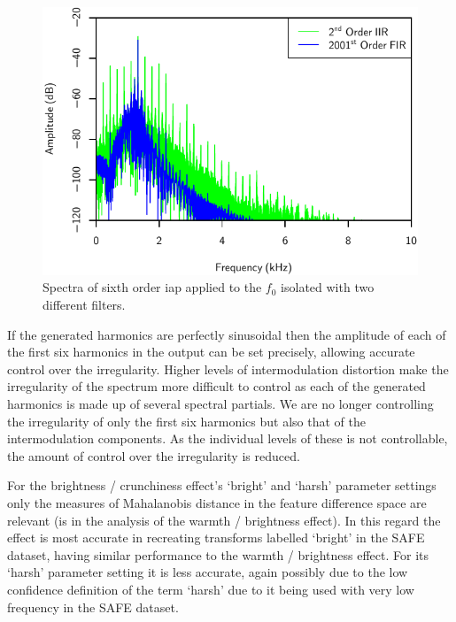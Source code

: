 			\begin{figure}[h!]
				\centering
				\includegraphics{chapter7/Images/CelloFilterOrderSpectra.pdf}
				\caption{Spectra of sixth order \acrshort{iap} applied to the $f_{0}$ isolated with two
					 different filters.}
				\label{fig:CelloFilterOrderSpectra}
			\end{figure}

			If the generated harmonics are perfectly sinusoidal then the amplitude of each of the first six
			harmonics in the output can be set precisely, allowing accurate control over the irregularity.
			Higher levels of intermodulation distortion make the irregularity of the spectrum more difficult to
			control as each of the generated harmonics is made up of several spectral partials. We are no
			longer controlling the irregularity of only the first six harmonics but also that of the
			intermodulation components. As the individual levels of these is not controllable, the amount of
			control over the irregularity is reduced.

			For the brightness / crunchiness effect's `bright' and `harsh' parameter settings only the measures
			of Mahalanobis distance in the feature difference space are relevant (is in the analysis of the
			warmth / brightness effect). In this regard the effect is most accurate in recreating transforms
			labelled `bright' in the SAFE dataset, having similar performance to the warmth / brightness
			effect.  For its `harsh' parameter setting it is less accurate, again possibly due to the low
			confidence definition of the term `harsh' due to it being used with very low frequency in the SAFE
			dataset.

